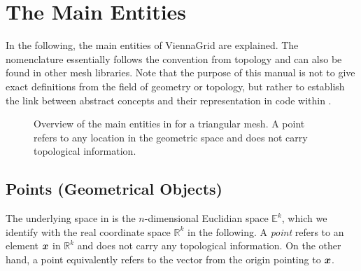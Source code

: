 \chapter{The Main Entities} \label{chap:entities}
In the following, the main entities of ViennaGrid are explained. The nomenclature essentially follows the convention from topology and can also be found in other mesh libraries. Note that the purpose of this manual is not to give exact definitions from the field of geometry or topology, but rather to establish the link between abstract concepts and their representation in code within {\ViennaGrid}.

\begin{figure}[tb]
\centering
 \caption{Overview of the main entities in {\ViennaGrid} for a triangular mesh. A point refers to any location in the geometric space and does not carry topological information.}
 \label{fig:entities}
\end{figure}


\section{Points (Geometrical Objects)}
The underlying space in {\ViennaGrid} is the $n$-dimensional Euclidian space $\mathbb{E}^k$, which we identify with the real coordinate space $\mathbb{R}^k$ in the following.
A \emph{point} refers to an element $\boldsymbol{x}$ in $\mathbb{R}^k$ and does not carry any topological information. On the other hand, a point equivalently refers to the vector from the origin pointing to $\boldsymbol{x}$.




